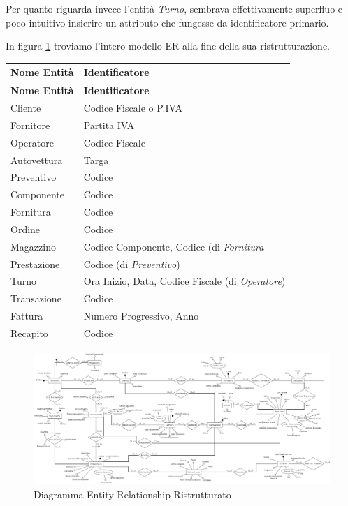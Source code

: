 		Per quanto riguarda invece l'entità \emph{Turno}, sembrava effettivamente superfluo e poco intuitivo insierire un attributo che fungesse da identificatore primario.

		In figura \ref{fig:schema_refactor} troviamo l'intero modello ER alla fine della sua ristrutturazione.
		
		\vspace{2ex}
		\begin{longtable}{| p{3cm} | p{9.4cm} |}
			\hline
			\textbf{Nome Entità} & \textbf{Identificatore} \\
			\hline
			\endfirsthead

			\hline
			\textbf{Nome Entità} & \textbf{Identificatore} \\
			\hline
			\endhead

			Cliente 		& Codice Fiscale o P.IVA 	\\ \hline
			Fornitore 		& Partita IVA 				\\ \hline
			Operatore 		& Codice Fiscale 			\\ \hline
			Autovettura  	& Targa						\\ \hline
			Preventivo 		& Codice					\\ \hline
			Componente 		& Codice					\\ \hline
			Fornitura 		& Codice					\\ \hline
			Ordine 			& Codice					\\ \hline
			Magazzino  		& Codice Componente, Codice (di \emph{Fornitura}			\\ \hline
			Prestazione 	& Codice (di \emph{Preventivo})								\\ \hline
			Turno			& Ora Inizio, Data, Codice Fiscale (di \emph{Operatore})	\\ \hline
			Transazione 	& Codice					\\ \hline
			Fattura         & Numero Progressivo, Anno 	\\ \hline
			Recapito 		& Codice 					\\

			\hline			
		\end{longtable}
		\vspace{2ex}

		\begin{figure}
			\centering
			\includegraphics[width=22cm]{images/refactor/schema.png}
			\caption{Diagramma Entity-Relationship Ristrutturato}
			\label{fig:schema_refactor}
		\end{figure}

